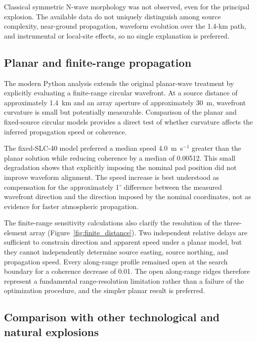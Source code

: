 \documentclass[]{seismica}
\begin{document}
Classical symmetric N-wave morphology was not observed, even for the
principal explosion. The available data do not uniquely distinguish among
source complexity, near-ground propagation, waveform evolution over the
1.4-km path, and instrumental or local-site effects, so no single explanation
is preferred.

\subsection{Planar and finite-range propagation}
\label{sec:discussion_propagation}

The modern Python analysis extends the original planar-wave treatment by explicitly evaluating a finite-range circular wavefront. At a source distance of approximately 1.4~km and an array aperture of approximately 30~m, wavefront curvature is small but potentially measurable. Comparison of the planar and fixed-source circular models provides a direct test of whether curvature affects the inferred propagation speed or coherence.

The fixed-SLC-40 model preferred a median speed 4.0~m~s$^{-1}$ greater than the
planar solution while reducing coherence by a median of 0.00512. This small
degradation shows that explicitly imposing the nominal pad position did not
improve waveform alignment. The speed increase is best understood as
compensation for the approximately 1$^\circ$ difference between the measured
wavefront direction and the direction imposed by the nominal coordinates, not
as evidence for faster atmospheric propagation.

The finite-range sensitivity calculations also clarify the resolution of the
three-element array (Figure~\ref{fig:finite_distance}). Two independent
relative delays are sufficient to constrain direction and apparent speed under
a planar model, but they cannot independently determine source easting, source
northing, and propagation speed. Every along-range profile remained open at
the search boundary for a coherence decrease of 0.01. The open along-range
ridges therefore represent a fundamental range-resolution limitation rather
than a failure of the optimization procedure, and the simpler planar result is
preferred.

\subsection{Comparison with other technological and natural explosions}
\label{sec:discussion_comparison}
\end{document}
